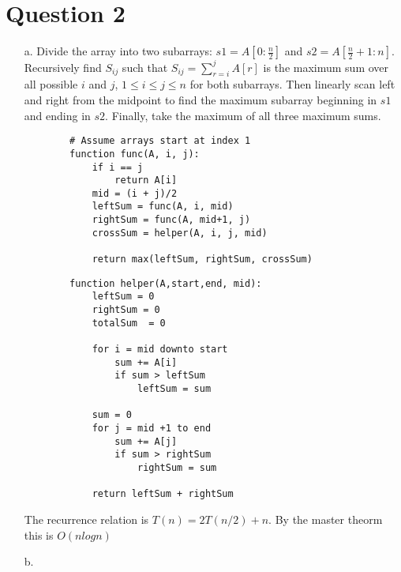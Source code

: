 \documentclass[12pt]{article}
\begin{document}
\section*{Question 2}
\begin{enumerate}
    \item[a.] Divide the array into two subarrays: $s1 = A[0:\frac{n}{2}]$ and $s2 = A[\frac{n}{2} + 1:n]$. Recursively find $S_{ij}$ such that $S_{ij} = \sum_{r=i}^j A[r]$ is the maximum sum over all possible $i$ and $j$, $1 \leq i \leq j \leq n$ for both subarrays. Then linearly scan left and right from the midpoint to find the maximum subarray beginning in $s1$ and ending in $s2$. Finally, take the maximum of all three maximum sums. 
    \begin{verbatim}
        # Assume arrays start at index 1
        function func(A, i, j):
            if i == j
                return A[i]
            mid = (i + j)/2
            leftSum = func(A, i, mid)
            rightSum = func(A, mid+1, j)
            crossSum = helper(A, i, j, mid)
        
            return max(leftSum, rightSum, crossSum)
    \end{verbatim}
    
    \begin{verbatim}
        function helper(A,start,end, mid):
            leftSum = 0
            rightSum = 0
            totalSum  = 0
        
            for i = mid downto start
                sum += A[i]
                if sum > leftSum
                    leftSum = sum
            
            sum = 0
            for j = mid +1 to end
                sum += A[j]
                if sum > rightSum
                    rightSum = sum
            
            return leftSum + rightSum
    \end{verbatim}
    
    The recurrence relation is $T(n) = 2T(n/2) + n$. By the master theorm this is $O(nlogn)$
    
    \item[b.] 
\end{enumerate}
\end{document}

